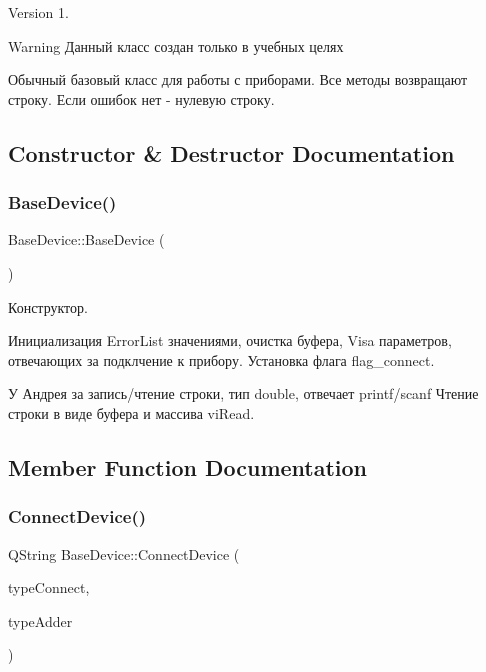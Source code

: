 \begin{DoxyVersion}{Version}
1. 
\end{DoxyVersion}
\begin{DoxyWarning}{Warning}
Данный класс создан только в учебных целях
\end{DoxyWarning}
Обычный базовый класс для работы с приборами. Все методы возвращают строку. Если ошибок нет -\/ нулевую строку. 

\subsection{Constructor \& Destructor Documentation}
\hypertarget{class_base_device_a163a3af4b53ebe0a947c62074f6216f3}{}\label{class_base_device_a163a3af4b53ebe0a947c62074f6216f3} 
\subsubsection{\texorpdfstring{Base\+Device()}{BaseDevice()}}
{\footnotesize\ttfamily Base\+Device\+::\+Base\+Device (\begin{DoxyParamCaption}{ }\end{DoxyParamCaption})}



Конструктор. 

Инициализация Error\+List значениями, очистка буфера, Visa параметров, отвечающих за подклчение к прибору. Установка флага flag\+\_\+connect.

У Андрея за запись/чтение строки, тип double, отвечает printf/scanf Чтение строки в виде буфера и массива vi\+Read. 

\subsection{Member Function Documentation}
\hypertarget{class_base_device_ae1cd92f757a47b0a7ebc0dfa2247e313}{}\label{class_base_device_ae1cd92f757a47b0a7ebc0dfa2247e313} 
\subsubsection{\texorpdfstring{Connect\+Device()}{ConnectDevice()}}
{\footnotesize\ttfamily Q\+String Base\+Device\+::\+Connect\+Device (\begin{DoxyParamCaption}\item[{Q\+String}]{type\+Connect,  }\item[{Q\+String}]{type\+Adder }\end{DoxyParamCaption})}



